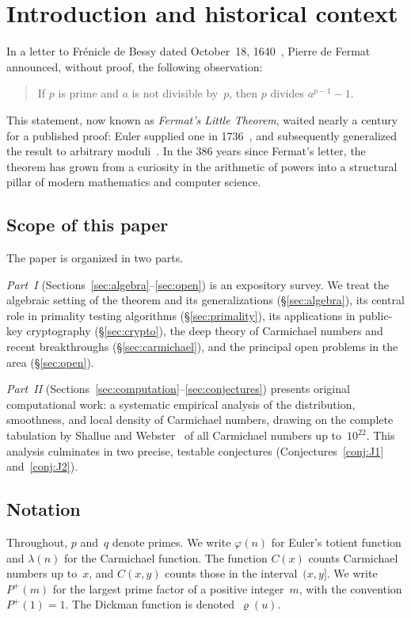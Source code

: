 \documentclass[12pt]{amsart}
\theoremstyle{plain}
\theoremstyle{definition}
\theoremstyle{remark}
\newcommand{\Pp}{P^{+}}
\begin{document}
\section{Introduction and historical context}\label{sec:intro}

In a letter to Fr\'enicle de Bessy dated October~18,
1640~\cite{fermat1640}, Pierre de Fermat announced, without proof,
the following observation:

\begin{quote}
If $p$ is prime and $a$ is not divisible by~$p$, then $p$ divides
$a^{p-1}-1$.
\end{quote}

\noindent
This statement, now known as \emph{Fermat's Little Theorem}, waited
nearly a century for a published proof: Euler supplied one in
1736~\cite{euler1736}, and subsequently generalized the result to
arbitrary moduli~\cite{euler1763}.  In the 386 years since Fermat's
letter, the theorem has grown from a curiosity in the arithmetic of
powers into a structural pillar of modern mathematics and computer
science.

\subsection*{Scope of this paper}
The paper is organized in two parts.

\emph{Part~I} (Sections~\ref{sec:algebra}--\ref{sec:open}) is an
expository survey.  We treat the algebraic setting of the theorem and
its generalizations (\S\ref{sec:algebra}), its central role in
primality testing algorithms (\S\ref{sec:primality}), its
applications in public-key cryptography (\S\ref{sec:crypto}), the
deep theory of Carmichael numbers and recent breakthroughs
(\S\ref{sec:carmichael}), and the principal open problems in the area
(\S\ref{sec:open}).

\emph{Part~II} (Sections~\ref{sec:computation}--\ref{sec:conjectures})
presents original computational work: a systematic empirical analysis
of the distribution, smoothness, and local density of Carmichael
numbers, drawing on the complete tabulation by Shallue and
Webster~\cite{shalluewebster2024} of all Carmichael numbers up
to~$10^{22}$.  This analysis culminates in two precise, testable
conjectures (Conjectures~\ref{conj:J1} and~\ref{conj:J2}).

\subsection*{Notation}
Throughout, $p$ and~$q$ denote primes.  We write $\varphi(n)$ for
Euler's totient function and $\lambda(n)$ for the Carmichael function.
The function $C(x)$ counts Carmichael numbers up to~$x$, and
$C(x,y)$ counts those in the interval~$(x,y]$.  We write
$\Pp(m)$ for the largest prime factor of a positive integer~$m$, with
the convention $\Pp(1)=1$.  The Dickman function is
denoted~$\varrho(u)$.
\end{document}
